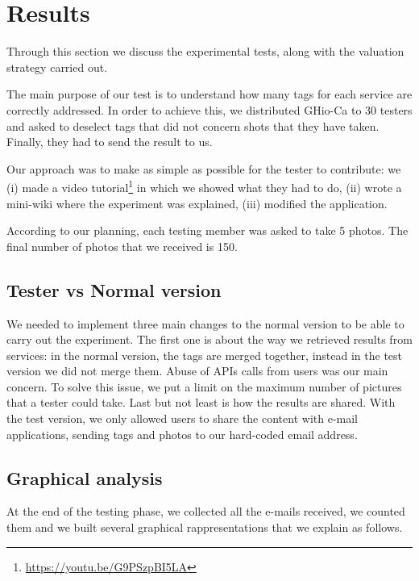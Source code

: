 \section{Results}
\label{sec:results}

Through this section we discuss the experimental tests, along with the valuation strategy carried out. 

The main purpose of our test is to understand how many tags for each service 
are correctly addressed. In order to achieve this, we distributed GHio-Ca to 
30 testers and asked to deselect tags that did not concern shots that they 
have taken. Finally, they had to send the result to us.

Our approach was to make as simple as possible for the tester to contribute: 
we (i) made a video tutorial\footnote{\url{https://youtu.be/G9PSzpBI5LA}} in 
which we showed what they had to do, (ii) wrote a mini-wiki where the 
experiment was explained, (iii) modified the application. 

According to our planning, each testing member was asked to take 5 photos. 
The final number of photos that we received is 150.

\subsection{Tester vs Normal version}

We needed to implement three main changes to the normal version to be able to 
carry out the experiment. The first one is about the way we retrieved results 
from services: in the normal version, the tags are merged together, instead in 
the test version we did not merge them.
Abuse of APIs calls from users was our main concern. To solve this issue, we 
put a limit on the maximum number of pictures that a tester could take.
Last but not least is how the results are shared. With the test version, we 
only allowed users to share the content with e-mail applications, sending tags 
and photos to our hard-coded email address.

\subsection{Graphical analysis}

At the end of the testing phase, we collected all the e-mails received, we 
counted them and we built several graphical rappresentations that we 
explain as follows.

